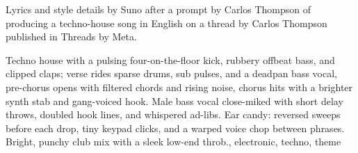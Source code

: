 

\begin{notes}
Lyrics and style details by Suno after a prompt by Carlos Thompson of producing a techno-house song in English on a thread by Carlos Thompson published in Threads by Meta.
\end{notes}

\begin{style}
Techno house with a pulsing four-on-the-floor kick, rubbery offbeat bass, and clipped claps; verse rides sparse drums, sub pulses, and a deadpan bass vocal, pre-chorus opens with filtered chords and rising noise, chorus hits with a brighter synth stab and gang-voiced hook. %
Male bass vocal close-miked with short delay throws, doubled hook lines, and whispered ad-libs. %
Ear candy: reversed sweeps before each drop, tiny keypad clicks, and a warped voice chop between phrases. %
Bright, punchy club mix with a sleek low-end throb., electronic, techno, theme
\end{style}

